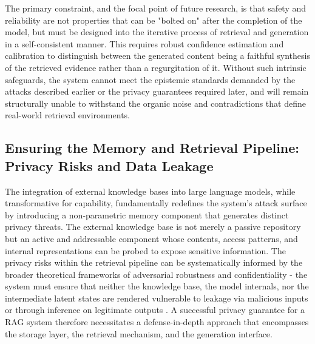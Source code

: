 \documentclass[11pt,a4paper]{article}
\begin{document}
The primary constraint, and the focal point of future research, is that safety and reliability are not properties that can be "bolted on" after the completion of the model, but must be designed into the iterative process of retrieval and generation in a self-consistent manner. This requires robust confidence estimation and calibration to distinguish between the generated content being a faithful synthesis of the retrieved evidence rather than a regurgitation of it. Without such intrinsic safeguards, the system cannot meet the epistemic standards demanded by the attacks described earlier or the privacy guarantees required later, and will remain structurally unable to withstand the organic noise and contradictions that define real-world retrieval environments.


\subsection{Ensuring the Memory and Retrieval Pipeline: Privacy Risks and Data Leakage}


The integration of external knowledge bases into large language models, while transformative for capability, fundamentally redefines the system's attack surface by introducing a non-parametric memory component that generates distinct privacy threats. The external knowledge base is not merely a passive repository but an active and addressable component whose contents, access patterns, and internal representations can be probed to expose sensitive information. The privacy risks within the retrieval pipeline can be systematically informed by the broader theoretical frameworks of adversarial robustness and confidentiality - the system must ensure that neither the knowledge base, the model internals, nor the intermediate latent states are rendered vulnerable to leakage via malicious inputs or through inference on legitimate outputs \cite{arxiv:2402.07867v1,arxiv:2406.05870v2}. A successful privacy guarantee for a RAG system therefore necessitates a defense-in-depth approach that encompasses the storage layer, the retrieval mechanism, and the generation interface.
\end{document}
